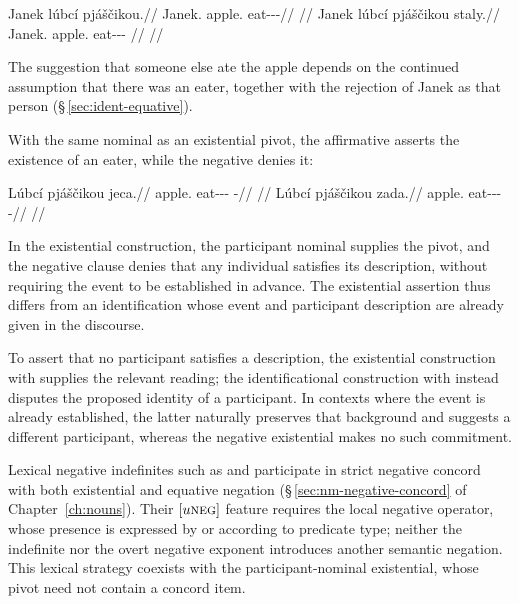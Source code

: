 \pex
\a
\begingl
\gla Janek lúbcí pjáščikou.//
\glb Janek.\Dir{} apple.\Ind{} eat-\Antip{}-\Pf{}-\Nmlz{}//
\glft {} //
\endgl
\a
\begingl
\gla Janek lúbcí pjáščikou staly.//
\glb Janek.\Dir{} apple.\Ind{} eat-\Antip{}-\Pf{}-\Nmlz{} \Neg{}//
\glft {} //
\endgl
\xe

\noindent The suggestion that someone else ate the apple depends on the
continued assumption that there was an eater, together with the rejection of
Janek as that person (§\,\ref{sec:ident-equative}).

With the same nominal as an existential pivot, the affirmative asserts the
existence of an eater, while the negative denies it:

\pex
\a
\begingl
\gla Lúbcí pjáščikou jeca.//
\glb apple.\Ind{} eat-\Antip{}-\Pf{}-\Nmlz{} \Exst{}-\Cont{}//
\glft {} //
\endgl
\a
\begingl
\gla Lúbcí pjáščikou zada.//
\glb apple.\Ind{} eat-\Antip{}-\Pf{}-\Nmlz{} \NegExst{}-\Cont{}//
\glft {} //
\endgl
\xe

\noindent In the existential construction, the participant nominal supplies the
pivot, and the negative clause denies that any individual satisfies its
description, without requiring the event to be established in advance.
The existential assertion thus differs from an identification whose event and
participant description are already given in the discourse.

To assert that no participant satisfies a description, the existential
construction with  supplies the relevant reading; the identificational
construction with  instead disputes the proposed identity of a
participant. In contexts where the event is already established, the latter
naturally preserves that background and suggests a different participant,
whereas the negative existential makes no such commitment.

Lexical negative indefinites such as   and
  participate in strict negative concord with both
existential and equative negation (§\,\ref{sec:nm-negative-concord} of
Chapter~\ref{ch:nouns}). Their $[u\textsc{neg}]$ feature requires the local negative
operator, whose presence is expressed by  or  according
to predicate type; neither the indefinite nor the overt negative exponent
introduces another semantic negation. This lexical strategy coexists with the
participant-nominal existential, whose pivot need not contain a concord item.

